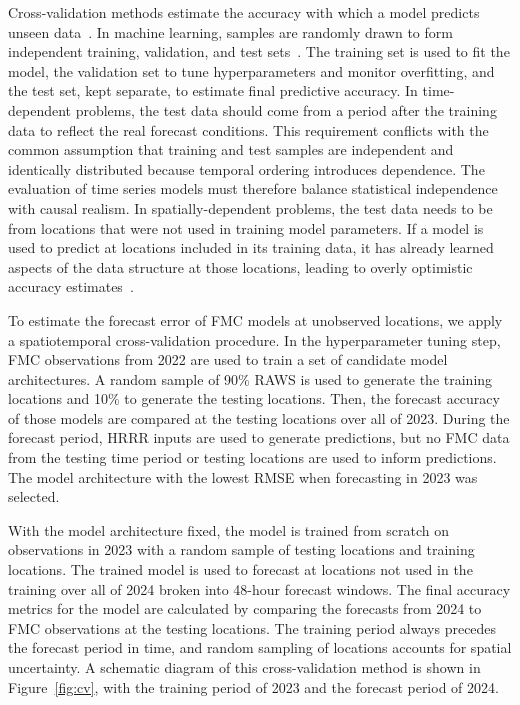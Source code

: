 \documentclass[fire,article,submit,pdftex,moreauthors]{Definitions/mdpi}
\begin{document}
Cross-validation methods estimate the accuracy with which a model predicts unseen data~\citep[Sect.~7.10]{Hastie-2010-ESL}. In machine learning, samples are randomly drawn to form independent training, validation, and test sets~\citep[Sect.~7.2]{Hastie-2010-ESL}. The training set is used to fit the model, the validation set to tune hyperparameters and monitor overfitting, and the test set, kept separate, to estimate final predictive accuracy. In time-dependent problems, the test data should come from a period after the training data to reflect the real forecast conditions. This requirement conflicts with the common assumption that training and test samples are independent and identically distributed because temporal ordering introduces dependence. The evaluation of time series models must therefore balance statistical independence with causal realism. In spatially-dependent problems, the test data needs to be from locations that were not used in training model parameters. If a model is used to predict at locations included in its training data, it has already learned aspects of the data structure at those locations, leading to overly optimistic accuracy estimates~\citep{Schreck-2023-MLV}.

To estimate the forecast error of FMC models at unobserved locations, we apply a spatiotemporal cross-validation procedure. In the hyperparameter tuning step, FMC observations from 2022 are used to train a set of candidate model architectures. A random sample of 90\% RAWS is used to generate the training locations and 10\% to generate the testing locations. Then, the forecast accuracy of those models are compared at the testing locations over all of 2023. During the forecast period, HRRR inputs are used to generate predictions, but no FMC data from the testing time period or testing locations are used to inform predictions. The model architecture with the lowest RMSE when forecasting in 2023 was selected. 

With the model architecture fixed, the model is trained from scratch on observations in 2023 with a random sample of testing locations and training locations. The trained model is used to forecast at locations not used in the training over all of 2024 broken into 48-hour forecast windows. The final accuracy metrics for the model are calculated by comparing the forecasts from 2024 to FMC observations at the testing locations. The training period always precedes the forecast period in time, and random sampling of locations accounts for spatial uncertainty. A schematic diagram of this cross-validation method is shown in Figure~\ref{fig:cv}, with the training period of 2023 and the forecast period of 2024.
\end{document}
